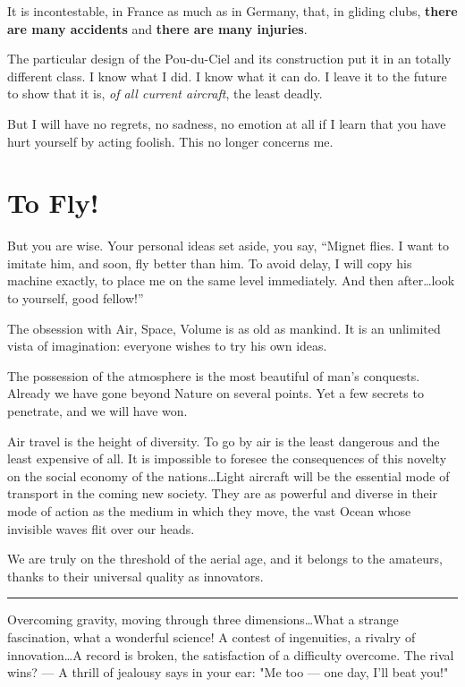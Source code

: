 \documentclass{book}
\newcommand*\sectline{
  \vspace{5pt}
  \begin{center}
    \rule{0.5\linewidth}{\linethickness}
  \end{center}
  \vspace{5pt}
}
\begin{document}
It is incontestable, in France as much as in Germany, that, in gliding
clubs, \textbf{there are many accidents} and \textbf{there are many
  injuries}.

The particular design of the Pou-du-Ciel and its construction put it
in an totally different class. I know what I did. I know what it can
do. I leave it to the future to show that it is, \textit{of all
  current aircraft}, the least deadly.

But I will have no regrets, no sadness, no emotion at all if I learn
that you have hurt yourself by acting foolish. This no longer concerns
me.

\section{To Fly!}

But you are wise. Your personal ideas set aside, you say, ``Mignet
flies. I want to imitate him, and soon, fly better than him. To avoid
delay, I will copy his machine exactly, to place me on the same level
immediately. And then after\ldots look to yourself, good fellow!''

The obsession with Air, Space, Volume is as old as mankind. It is an
unlimited vista of imagination: everyone wishes to try his own ideas.

The possession of the atmosphere is the most beautiful of man's
conquests.  Already we have gone beyond Nature on several points. Yet
a few secrets to penetrate, and we will have won.

Air travel is the height of diversity. To go by air is the least
dangerous and the least expensive of all.  It is impossible to foresee
the consequences of this novelty on the social economy of the
nations\ldots Light aircraft will be the essential mode of transport
in the coming new society.  They are as powerful and diverse in their
mode of action as the medium in which they move, the vast Ocean whose
invisible waves flit over our heads.

We are truly on the threshold of the aerial age, and it belongs to the
amateurs, thanks to their universal quality as innovators.

\sectline

Overcoming gravity, moving through three dimensions\ldots What a
strange fascination, what a wonderful science!  A contest of
ingenuities, a rivalry of innovation\ldots A record is broken, the
satisfaction of a difficulty overcome. The rival wins? --- A thrill of
jealousy says in your ear: "Me too --- one day, I'll beat you!"
\end{document}

